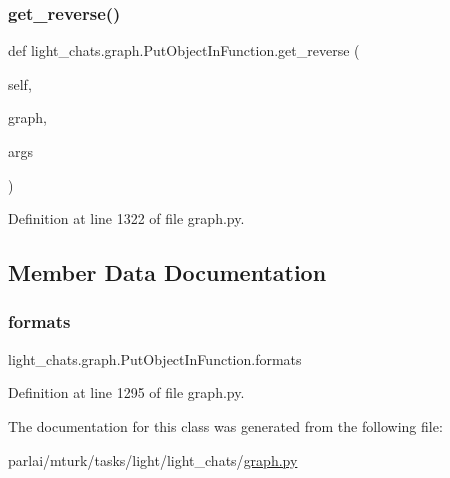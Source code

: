 \subsubsection{\texorpdfstring{get\+\_\+reverse()}{get\_reverse()}}
{\footnotesize\ttfamily def light\+\_\+chats.\+graph.\+Put\+Object\+In\+Function.\+get\+\_\+reverse (\begin{DoxyParamCaption}\item[{}]{self,  }\item[{}]{graph,  }\item[{}]{args }\end{DoxyParamCaption})}



Definition at line 1322 of file graph.\+py.



\subsection{Member Data Documentation}
\mbox{\label{classlight__chats_1_1graph_1_1PutObjectInFunction_ad244ff0f442d2c6b785022457e330040}} 
\subsubsection{\texorpdfstring{formats}{formats}}
{\footnotesize\ttfamily light\+\_\+chats.\+graph.\+Put\+Object\+In\+Function.\+formats}



Definition at line 1295 of file graph.\+py.



The documentation for this class was generated from the following file\+:\begin{DoxyCompactItemize}
\item 
parlai/mturk/tasks/light/light\+\_\+chats/\hyperlink{parlai_2mturk_2tasks_2light_2light__chats_2graph_8py}{graph.\+py}\end{DoxyCompactItemize}
